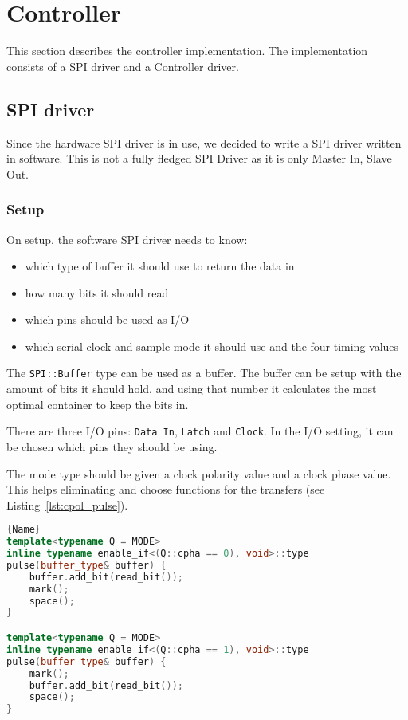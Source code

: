 \section{Controller}

This section describes the controller implementation. The implementation consists of a SPI driver and a Controller driver.

\subsection{SPI driver}

Since the hardware SPI driver is in use, we decided to write a SPI driver written in software. This is not a fully fledged SPI Driver as it is only Master In, Slave Out.

\subsubsection{Setup}

On setup, the software SPI driver needs to know: 
\begin{itemize}
	\item which type of buffer it should use to return the data in
	\item how many bits it should read
	\item which pins should be used as I/O
	\item which serial clock and sample mode it should use and the four timing values
\end{itemize}

The \texttt{SPI::Buffer} type can be used as a buffer. The buffer can be setup with the amount of bits it should hold, and using that number it calculates  the most optimal container to keep the bits in.

There are three I/O pins: \texttt{Data In}, \texttt{Latch} and \texttt{Clock}. In the I/O setting, it can be chosen which pins they should be using.

The mode type should be given a clock polarity value and a clock phase value. This helps eliminating and choose functions for the transfers (see Listing~\ref{lst:cpol_pulse}).

\begin{lstlisting}[caption={CPOL Determines when to sample},label={lst:cpol_pulse},frame=tlrb, language=C++]{Name}
template<typename Q = MODE>
inline typename enable_if<(Q::cpha == 0), void>::type
pulse(buffer_type& buffer) {
    buffer.add_bit(read_bit());
  	mark();
  	space();
}

template<typename Q = MODE>
inline typename enable_if<(Q::cpha == 1), void>::type
pulse(buffer_type& buffer) {
    mark();
  	buffer.add_bit(read_bit());
  	space();
}
\end{lstlisting}

